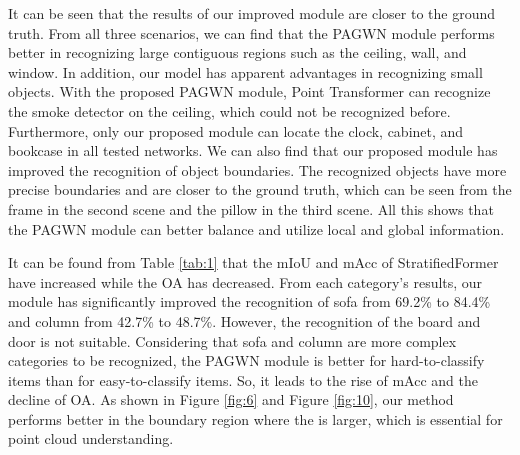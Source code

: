 \documentclass[10pt,twocolumn,letterpaper]{article}
\begin{document}
        It can be seen that the results of our improved module are closer to the ground truth.
        From all three scenarios, we can find that the PAGWN module performs better in recognizing large contiguous regions such as the ceiling, wall, and window.
        In addition, our model has apparent advantages in recognizing small objects.
        With the proposed PAGWN module, Point Transformer can recognize the smoke detector on the ceiling, which could not be recognized before.
        Furthermore, only our proposed module can locate the clock, cabinet, and bookcase in all tested networks.
        We can also find that our proposed module has improved the recognition of object boundaries.
        The recognized objects have more precise boundaries and are closer to the ground truth, which can be seen from the frame in the second scene and the pillow in the third scene.
        All this shows that the PAGWN module can better balance and utilize local and global information.

        It can be found from Table \ref{tab:1} that the mIoU and mAcc of StratifiedFormer have increased while the OA has decreased.
        From each category's results, our module has significantly improved the recognition of sofa from 69.2\% to 84.4\% and column from 42.7\% to 48.7\%.
        However, the recognition of the board and door is not suitable.
        Considering that sofa and column are more complex categories to be recognized, the PAGWN module is better for hard-to-classify items than for easy-to-classify items.
        So, it leads to the rise of mAcc and the decline of OA.
        As shown in Figure \ref{fig:6} and Figure \ref{fig:10}, our method performs better in the boundary region where the  is larger, which is essential for point cloud understanding.
\end{document}
